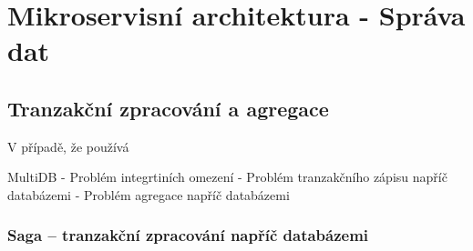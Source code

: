 \chapter{Mikroservisní architektura - Správa dat}\label{ch:msa-data}







\section{Tranzakční zpracování a agregace}\label{sec:msa-data-transaction}
V případě, že  používá

MultiDB
- Problém integrtiních omezení
- Problém tranzakčního zápisu napříč databázemi
- Problém agregace napříč databázemi


\subsection{Saga – tranzakční zpracování napříč databázemi}\label{subsec:saga-transaction-processing}


